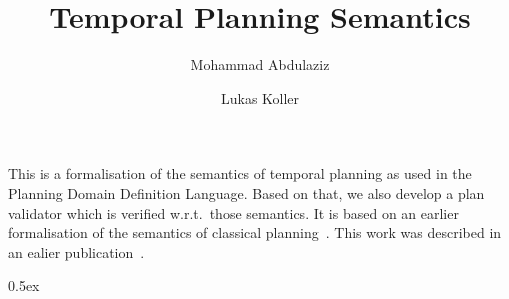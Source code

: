 \documentclass[11pt,a4paper]{article}
\begin{document}
\title{Temporal Planning Semantics}
\author{Mohammad Abdulaziz \and Lukas Koller}
\date{}

\maketitle

This is a formalisation of the semantics of temporal planning as used in the Planning Domain
Definition Language. Based on that, we also develop a plan validator which is verified w.r.t.\ those
semantics. It is based on an earlier formalisation of the semantics of classical planning~\cite{classicalPlanningSemAFP}.
 This work was described in an ealier publication~\cite{TemporalSemantics}. 
\tableofcontents

\clearpage

\parindent 0pt\parskip 0.5ex





\end{document}
